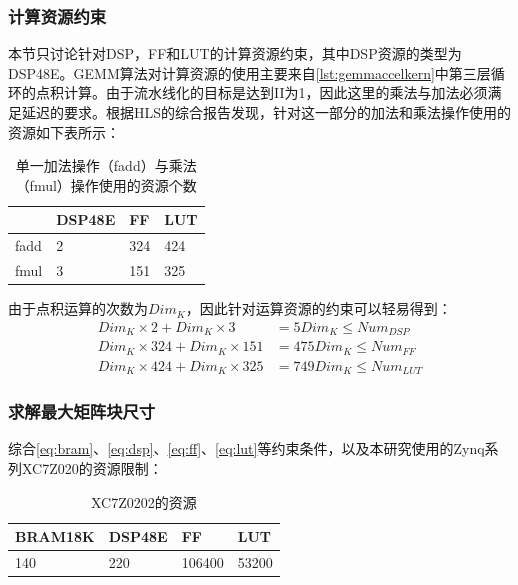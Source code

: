 \subsubsection{计算资源约束}
本节只讨论针对DSP，FF和LUT的计算资源约束，其中DSP资源的类型为DSP48E。GEMM算法对计算资源的使用主要来自\ref{lst:gemmaccelkern}中第三层循环的点积计算。由于流水线化的目标是达到II为1，因此这里的乘法与加法必须满足延迟的要求。根据HLS的综合报告发现，针对这一部分的加法和乘法操作使用的资源如下表所示：

\begin{table}[!ht]
	\centering
	\begin{tabular}{|l|l|l|l|}
		\hline
			 & DSP48E & FF & LUT \\ \hline
		fadd & 2 & 324 & 424 \\ \hline
		fmul & 3 & 151 & 325 \\ \hline
	\end{tabular}
	
	\caption{单一加法操作（fadd）与乘法（fmul）操作使用的资源个数}
	\label{table:gemmres}
\end{table}

由于点积运算的次数为\(\mathit{Dim_K}\)，因此针对运算资源的约束可以轻易得到：
\begin{align}
\mathit{Dim_K \times 2 + Dim_K \times 3} 
& = \mathit{5 Dim_K} \leq \mathit{Num_{DSP}} 
\label{eq:dsp} \\
\mathit{Dim_K \times 324 + Dim_K \times 151} 
& = \mathit{475 Dim_K} \leq \mathit{Num_{FF}} 
\label{eq:ff} \\
\mathit{Dim_K \times 424 + Dim_K \times 325} 
& = \mathit{749 Dim_K} \leq \mathit{Num_{LUT}} 
\label{eq:lut}
\end{align}

\subsubsection{求解最大矩阵块尺寸}\label{subsubsec:maxdim}
综合\ref{eq:bram}、\ref{eq:dsp}、\ref{eq:ff}、\ref{eq:lut}等约束条件，以及本研究使用的Zynq系列XC7Z020的资源限制\supercite{ds190}：

\begin{table}[!ht]
	\centering
	\begin{tabular}{|l|l|l|l|}
		\hline
		BRAM18K & DSP48E & FF & LUT \\ \hline
		140 & 220 & 106400 & 53200 \\ \hline
	\end{tabular}

	\caption{XC7Z0202的资源}
	\label{table:xc7z020res}
\end{table}

